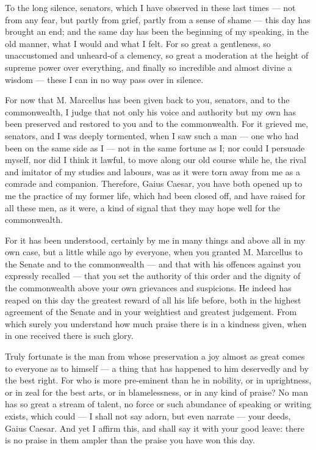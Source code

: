 
 To the long silence, senators, which I have observed in these last times --- not from any fear, but partly from grief, partly from a sense of shame --- this day has brought an end; and the same day has been the beginning of my speaking, in the old manner, what I would and what I felt. For so great a gentleness, so unaccustomed and unheard-of a clemency, so great a moderation at the height of supreme power over everything, and finally so incredible and almost divine a wisdom --- these I can in no way pass over in silence.

 For now that M. Marcellus has been given back to you, senators, and to the commonwealth, I judge that not only his voice and authority but my own has been preserved and restored to you and to the commonwealth. For it grieved me, senators, and I was deeply tormented, when I saw such a man --- one who had been on the same side as I --- not in the same fortune as I; nor could I persuade myself, nor did I think it lawful, to move along our old course while he, the rival and imitator of my studies and labours, was as it were torn away from me as a comrade and companion. Therefore, Gaius Caesar, you have both opened up to me the practice of my former life, which had been closed off, and have raised for all these men, as it were, a kind of signal that they may hope well for the commonwealth.

 For it has been understood, certainly by me in many things and above all in my own case, but a little while ago by everyone, when you granted M. Marcellus to the Senate and to the commonwealth --- and that with his offences against you expressly recalled --- that you set the authority of this order and the dignity of the commonwealth above your own grievances and suspicions. He indeed has reaped on this day the greatest reward of all his life before, both in the highest agreement of the Senate and in your weightiest and greatest judgement. From which surely you understand how much praise there is in a kindness given, when in one received there is such glory.

 Truly fortunate is the man from whose preservation a joy almost as great comes to everyone as to himself --- a thing that has happened to him deservedly and by the best right. For who is more pre-eminent than he in nobility, or in uprightness, or in zeal for the best arts, or in blamelessness, or in any kind of praise? No man has so great a stream of talent, no force or such abundance of speaking or writing exists, which could --- I shall not say adorn, but even narrate --- your deeds, Gaius Caesar. And yet I affirm this, and shall say it with your good leave: there is no praise in them ampler than the praise you have won this day.

